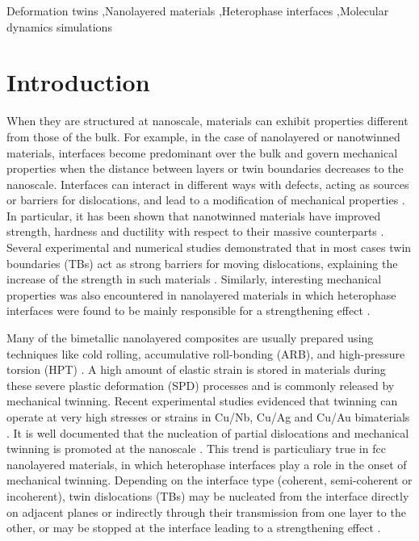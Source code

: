 \documentclass[final,3p,times,twocolumn]{elsarticle}
\begin{document}
\begin{frontmatter}
\begin{keyword}

Deformation twins \sep Nanolayered materials \sep Heterophase interfaces \sep Molecular dynamics simulations




\end{keyword}

\end{frontmatter}


\section{Introduction}

When they are structured at nanoscale, materials can exhibit properties different from those of the bulk. For example, in the case of nanolayered or nanotwinned materials, interfaces become predominant over the bulk and govern mechanical properties when the distance between layers or twin boundaries decreases to the nanoscale. Interfaces can interact in different ways with defects, acting as sources or barriers for dislocations, and lead to a modification of mechanical properties \cite{beyerlein15PMS}. In particular, it has been shown that nanotwinned materials have improved strength, hardness and ductility with respect to their massive counterparts \cite{lu04S,lu09S,stukowski10PRB,sansoz07NL}. Several experimental and numerical studies demonstrated that in most cases twin boundaries (TBs) act as strong barriers for moving dislocations, explaining the increase of the strength in such materials \cite{wu09AM,deng09NL,cao15SM}. Similarly, interesting mechanical properties was also encountered in nanolayered materials in which heterophase interfaces were found to be mainly responsible for a strengthening effect \cite{misra01AEM,misra05AM}.

Many of the bimetallic nanolayered composites are usually prepared using techniques like cold rolling, accumulative roll-bonding (ARB), and high-pressure torsion (HPT) \cite{tian13SM,han12APL}. A high amount of elastic strain is stored in materials during these severe plastic deformation (SPD) processes and is commonly released by mechanical twinning. Recent experimental studies evidenced that twinning can operate at very high stresses or strains in Cu/Nb, Cu/Ag and Cu/Au bimaterials \cite{zheng14AM}. It is well documented that the nucleation of partial dislocations and mechanical twinning is promoted at the nanoscale \cite{chen03S,dehm07AM}. This trend is particuliary true in fcc nanolayered materials, in which heterophase interfaces play a role in the onset of mechanical twinning. Depending on the interface type (coherent, semi-coherent or incoherent), twin dislocations (TBs) may be nucleated from the interface directly on adjacent planes or indirectly through their transmission from one layer to the other, or may be stopped at the interface leading to a strengthening effect \cite{an15APL}.
\end{document}

